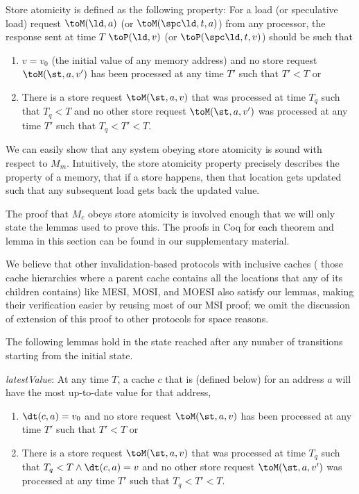 \begin{defn}
Store atomicity is defined as the following property:
For a load (or speculative load) request $\toM(\ld, a)$ (or $\toM(\spc\ld, t, a)$)
from any processor, the response sent at time $T$
$\toP(\ld, v)$ (or $\toP(\spc\ld, t, v)$) should be such that
\begin{enumerate}
\item $v = v_0$ (the initial value of any memory address) and no store
  request $\toM(\st, a, v')$ has been processed at any time $T'$ such
  that $T' < T$ or
\item There is a store request $\toM(\st, a, v)$ that was processed at time $T_q$ such that
$T_q < T$ and no other store
request $\toM(\st, a, v')$ was processed at any time $T'$ such that $T_q < T' < T$.
\end{enumerate}
\label{sa}
\end{defn}

We can easily show that any system obeying store atomicity is sound with
respect to $M_m$. Intuitively, the store atomicity property precisely describes
the property of a memory, \viz{} that if a store happens, then that location
gets updated such that any subsequent load gets back the updated value.

The proof that $M_c$ obeys store atomicity is involved enough that we will only
state the lemmas used to prove this. The proofs in Coq for each theorem and
lemma in this section can be found in our supplementary material.

We believe that other invalidation-based protocols with inclusive caches (\ie{}
those cache hierarchies where a parent cache contains all the locations that
any of its children contains) like MESI, MOSI, and MOESI also satisfy our
lemmas, making their verification easier by reusing most of our MSI proof; we
omit the discussion of extension of this proof to other protocols for space
reasons.

The following lemmas hold in the state reached after any number of transitions
starting from the initial state.

\begin{lemma}
\textit{latestValue}:
At any time $T$, a cache $c$ that is \clean{} (defined below) for an address
$a$ will have the most up-to-date value for that address, \ie{}
\begin{enumerate}
\item $\dt(c,a) = v_0$ and no store request $\toM(\st, a, v)$ has been processed at
any time $T'$ such that $T' < T$ or
\item There is a store request $\toM(\st, a, v)$ that was processed at time $T_q$ such that
$T_q < T \wedge \dt(c,a) = v$ and no other store
request $\toM(\st, a, v')$ was processed at any time $T'$ such that $T_q < T' < T$.
\end{enumerate}
\label{latestValue}
\end{lemma}

